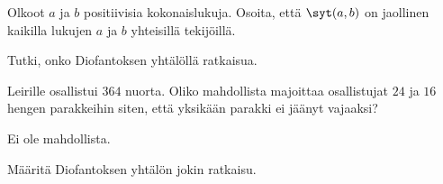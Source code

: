 \begin{tehtava}
    Olkoot $a$ ja $b$ positiivisia kokonaislukuja. Osoita, että $\syt(a, b)$ on jaollinen kaikilla lukujen $a$ ja $b$ yhteisillä tekijöillä.
\end{tehtava}

\begin{tehtava}
    Tutki, onko Diofantoksen yhtälöllä ratkaisua.
    
    \begin{alakohdat}
    \end{alakohdat}

    \begin{vastaus}
        \begin{alakohdat}
        \end{alakohdat}
    \end{vastaus}
    
\end{tehtava}

\begin{tehtava}
    Leirille osallistui $364$ nuorta. Oliko mahdollista majoittaa osallistujat $24$ ja $16$ hengen parakkeihin siten, että yksikään parakki ei jäänyt vajaaksi?
    
    \begin{vastaus}
        Ei ole mahdollista.
    \end{vastaus}
    
\end{tehtava}

\begin{tehtava}
    Määritä Diofantoksen yhtälön jokin ratkaisu.
    
    \begin{alakohdat}
    \end{alakohdat}

    \begin{vastaus}
        \begin{alakohdat}
        \end{alakohdat}
    \end{vastaus}
    
\end{tehtava}

